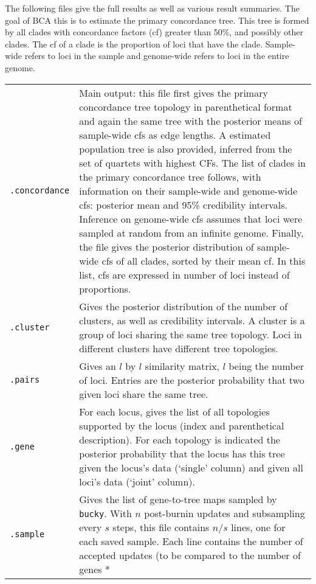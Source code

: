 \documentclass[12pt,english,final,letterpaper]{article}
\begin{document}
The following files give the full results as well as various result summaries.
The goal of BCA this is to estimate the primary
concordance tree. This tree is formed by all clades with concordance 
factors ({\sc cf}) greater than 50\%, and possibly other clades. 
The {\sc cf} of a clade is the proportion of loci that have 
the clade. Sample-wide refers to loci in the sample and genome-wide 
refers to loci in the entire genome.

\bigskip

\noindent
\begin{longtable}{l|p{5.1in}}
{\tt .concordance}&Main output: 
this file first gives the primary concordance tree topology in parenthetical 
format and again the same tree with the posterior means of 
sample-wide {\sc cf}s as edge lengths.
A estimated population tree is also provided, inferred from the
set of quartets with highest {\sc CF}s.
The list of clades in the primary concordance tree follows, with 
information on their sample-wide and genome-wide {\sc cf}s: 
posterior mean and 95\% credibility intervals. Inference on 
genome-wide {\sc cf}s assumes that loci were sampled at random
from an infinite genome.
Finally, the file gives the posterior distribution of sample-wide
{\sc cf}s of all clades, sorted by their mean {\sc cf}. 
In this list, {\sc cf}s are expressed in number of loci 
instead of proportions. \\
{\tt .cluster}&Gives the posterior distribution of the number of 
clusters, as well as credibility intervals. A cluster is a group of loci 
sharing the same tree topology. Loci in different clusters have different 
tree topologies.\\
{\tt .pairs}&Gives an $l$ by $l$ similarity matrix, $l$ being the number 
of loci. Entries are the posterior probability that two given loci share 
the same tree.\\
{\tt .gene}& For each locus, gives the list of all topologies 
supported by the locus (index and parenthetical description). For each
topology is indicated the posterior probability that the locus has this
tree given the locus's data (`single' column) and given all loci's
data (`joint' column).\\
{\tt .sample}& Gives the list of gene-to-tree maps sampled by 
{\tt bucky}. With $n$ post-burnin updates and subsampling every $s$ steps, 
this file contains $n/s$ lines, one for each saved sample. Each line contains 
the number of accepted updates (to be compared to the number of genes * 

\end{longtable}
\end{document}
